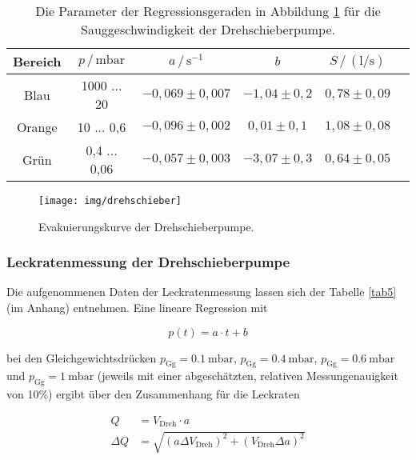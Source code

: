 \begin{table}
	\begin{center}
		\begin{tabular}{cccccc}
			\toprule
			Bereich & $p \, / \, \text{mbar}$ & $a \, / \, \text{s}^{-1}$ &        $b$        & $S \, / \, (\text{l}/\text{s})$ &  \\ \midrule
			 Blau   &       1000 ... 20       &    $-0,069 \pm 0,007 $    & $ -1,04 \pm 0,2 $ &      $ 0,78 \pm 0,09     $      &  \\
			Orange  &       10 ... 0,6        &    $-0,096 \pm 0,002$     &  $0,01 \pm 0,1 $  &      $  1,08 \pm 0,08   $       &  \\
			 Grün   &      0,4 ... 0,06       &    $-0,057 \pm 0,003$     & $ -3,07 \pm 0,3 $ &      $  0,64 \pm 0,05   $       &  \\ \bottomrule
		\end{tabular}
		\caption{Die Parameter der Regressionsgeraden in Abbildung \ref{fig:drehschieber} für die Sauggeschwindigkeit der Drehschieberpumpe.}
		\label{tab3}
	\end{center}
\end{table}

\begin{figure}
	\centering
	\texttt{[image: img/drehschieber]}
	\caption{Evakuierungskurve der Drehschieberpumpe.}
	\label{fig:drehschieber}
\end{figure}


\subsubsection{Leckratenmessung der Drehschieberpumpe}

Die aufgenommenen Daten der Leckratenmessung lassen sich der Tabelle \ref{tab5} (im Anhang) entnehmen. Eine lineare Regression mit

\begin{equation}
p(t) = a \cdot t + b
\end{equation}

bei den Gleichgewichtsdrücken $p_\text{Gg} = \SI{0.1}{\milli \bar}$, $p_\text{Gg} = \SI{0.4}{\milli \bar}$, $p_\text{Gg} = \SI{0.6}{\milli \bar}$ und $p_\text{Gg} = \SI{1}{\milli \bar}$ (jeweils mit einer abgeschätzten, relativen Messungenauigkeit von 10\%) ergibt über den Zusammenhang für die Leckraten


\begin{align}
	Q &= V_\text{Dreh} \cdot a\\
	\Delta Q &= \sqrt{\left(a \Delta V_\text{Dreh} \right)^2 + \left(V_\text{Dreh} \Delta a\right)^2}
\end{align}

